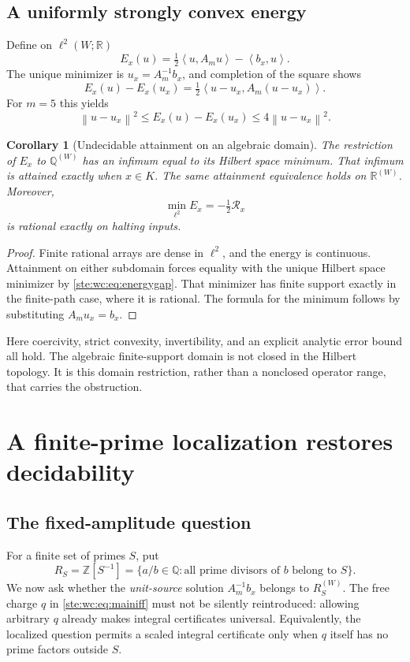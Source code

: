 \documentclass[11pt,letterpaper]{article}
\newtheorem{corollary}[theorem]{Corollary}
\theoremstyle{definition}
\theoremstyle{remark}
\newcommand{\Z}{\mathbb Z}
\newcommand{\Q}{\mathbb Q}
\newcommand{\R}{\mathbb R}
\newcommand{\norm}[1]{\left\lVert #1\right\rVert}
\newcommand{\ip}[2]{\left\langle#1,#2\right\rangle}
\begin{document}
\subsection{A uniformly strongly convex energy}
Define on $\ell^2(W;\R)$
\begin{equation}\label{ste:wc:eq:energy}
 E_x(u)=\tfrac12\ip{u}{A_mu}-\ip{b_x}{u}.
\end{equation}
The unique minimizer is $u_x=A_m^{-1}b_x$, and completion of the square
shows
\begin{equation}\label{ste:wc:eq:energygap}
 E_x(u)-E_x(u_x)=\tfrac12\ip{u-u_x}{A_m(u-u_x)}.
\end{equation}
For $m=5$ this yields
\[
 \norm{u-u_x}^2\leq E_x(u)-E_x(u_x)\leq4\norm{u-u_x}^2.
\]

\begin{corollary}[Undecidable attainment on an algebraic domain]
\label{ste:wc:cor:attainment}
The restriction of $E_x$ to $\Q^{(W)}$ has an infimum equal to its Hilbert
space minimum. That infimum is attained exactly when $x\in K$. The same
attainment equivalence holds on $\R^{(W)}$. Moreover,
\[
 \min_{\ell^2} E_x=-\tfrac12\mathcal R_x
\]
is rational exactly on halting inputs.
\end{corollary}
\begin{proof}
Finite rational arrays are dense in $\ell^2$, and the energy is continuous.
Attainment on either subdomain forces equality with the unique Hilbert
space minimizer by \eqref{ste:wc:eq:energygap}. That minimizer has finite support
exactly in the finite-path case, where it is rational. The formula for the
minimum follows by substituting $A_mu_x=b_x$.
\end{proof}

Here coercivity, strict convexity, invertibility, and an explicit analytic
error bound all hold. The algebraic finite-support domain is not closed
in the Hilbert topology. It is this domain restriction, rather than a
nonclosed operator range, that carries the obstruction.

\section{A finite-prime localization restores decidability}
\label{ste:wc:sec:localization}

\subsection{The fixed-amplitude question}
For a finite set of primes $S$, put
\[
 R_S=\Z[S^{-1}]
 =\{a/b\in\Q:\text{all prime divisors of }b\text{ belong to }S\}.
\]
We now ask whether the \emph{unit-source} solution $A_m^{-1}b_x$ belongs to
$R_S^{(W)}$. The free charge $q$ in \eqref{ste:wc:eq:mainiff} must not be silently
reintroduced: allowing arbitrary $q$ already makes integral certificates
universal. Equivalently, the localized question permits a scaled integral
certificate only when $q$ itself has no prime factors outside $S$.
\end{document}

